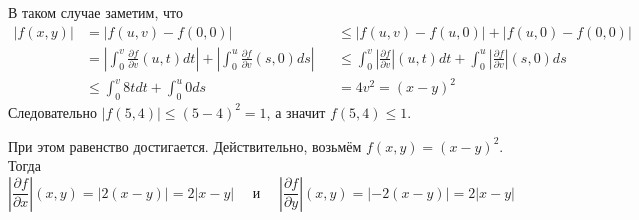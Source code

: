 \documentclass[12pt,a4paper]{article}
\begin{document}
\begin{enumproblem}
        В таком случае заметим, что
        \begin{align*}
            |f(x, y)|
            &= |f(u, v) - f(0, 0)|&
            &\leqslant |f(u, v) - f(u, 0)| + |f(u, 0) - f(0, 0)|\\
            &= \left|\int_{0}^v \frac{\partial f}{\partial v} (u, t) dt\right| + \left|\int_{0}^u \frac{\partial f}{\partial v} (s, 0) ds\right|&
            &\leqslant \int_{0}^v \left|\frac{\partial f}{\partial v}\right| (u, t) dt + \int_{0}^u \left|\frac{\partial f}{\partial v}\right| (s, 0) ds\\
            &\leqslant \int_{0}^v 8t dt + \int_{0}^u 0 ds&
            &= 4v^2 = (x-y)^2
        \end{align*}
        Следовательно $|f(5, 4)| \leqslant (5 - 4)^2 = 1$, а значит $f(5, 4) \leqslant 1$.

        При этом равенство достигается. Действительно, возьмём $f(x, y) = (x-y)^2$. Тогда
        \[
            \left|\frac{\partial f}{\partial x}\right| (x, y) = |2(x-y)| = 2|x-y|
            \quad \text{ и } \quad
            \left|\frac{\partial f}{\partial y}\right| (x, y) = |-2(x-y)| = 2|x-y|
        \]
    \end{enumproblem}
\end{document}
